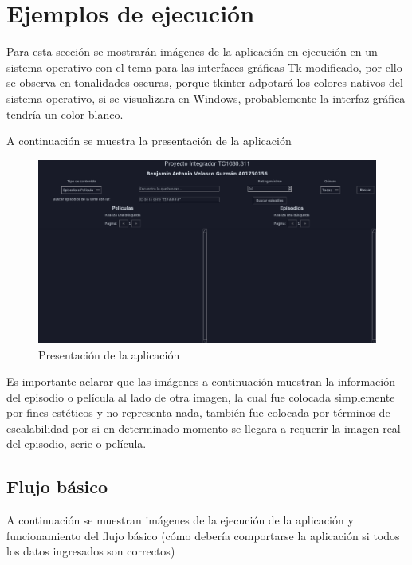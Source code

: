 \section{Ejemplos de ejecución}

Para esta sección se mostrarán imágenes de la aplicación en ejecución en un sistema operativo con el tema para las interfaces gráficas Tk modificado, por ello se observa en tonalidades oscuras, porque tkinter adpotará los colores nativos del sistema operativo, si se visualizara en Windows, probablemente la interfaz gráfica tendría un color blanco.

A continuación se muestra la presentación de la aplicación

\begin{figure}[h!]
	\centering
	\includegraphics[width=0.9\linewidth]{interface-start}
	\caption{Presentación de la aplicación}
\end{figure}

Es importante aclarar que las imágenes a continuación muestran la información del episodio o película al lado de otra imagen, la cual fue colocada simplemente por fines estéticos y no representa nada, también fue colocada por términos de escalabilidad por si en determinado momento se llegara a requerir la imagen real del episodio, serie o película.

\subsection{Flujo básico}
A continuación se muestran imágenes de la ejecución de la aplicación y funcionamiento del flujo básico (cómo debería comportarse la aplicación si todos los datos ingresados son correctos)\newline

